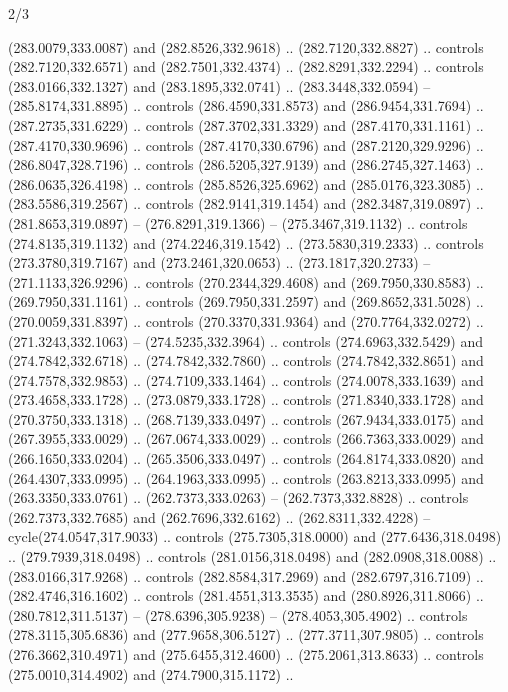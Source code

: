 \begin{flagdescription}{2/3}
\begin{scope}[xshift=0.5\flaglength,yshift=0.5\flagwidth,scale=\flagwidth/311.22]
\begin{scope}[y=0.8pt, x=0.8pt, yscale=-1,shift={(-291.77,-194.51)}]
  (283.0079,333.0087) and (282.8526,332.9618) .. (282.7120,332.8827) .. controls
  (282.7120,332.6571) and (282.7501,332.4374) .. (282.8291,332.2294) .. controls
  (283.0166,332.1327) and (283.1895,332.0741) .. (283.3448,332.0594) --
  (285.8174,331.8895) .. controls (286.4590,331.8573) and (286.9454,331.7694) ..
  (287.2735,331.6229) .. controls (287.3702,331.3329) and (287.4170,331.1161) ..
  (287.4170,330.9696) .. controls (287.4170,330.6796) and (287.2120,329.9296) ..
  (286.8047,328.7196) .. controls (286.5205,327.9139) and (286.2745,327.1463) ..
  (286.0635,326.4198) .. controls (285.8526,325.6962) and (285.0176,323.3085) ..
  (283.5586,319.2567) .. controls (282.9141,319.1454) and (282.3487,319.0897) ..
  (281.8653,319.0897) -- (276.8291,319.1366) -- (275.3467,319.1132) .. controls
  (274.8135,319.1132) and (274.2246,319.1542) .. (273.5830,319.2333) .. controls
  (273.3780,319.7167) and (273.2461,320.0653) .. (273.1817,320.2733) --
  (271.1133,326.9296) .. controls (270.2344,329.4608) and (269.7950,330.8583) ..
  (269.7950,331.1161) .. controls (269.7950,331.2597) and (269.8652,331.5028) ..
  (270.0059,331.8397) .. controls (270.3370,331.9364) and (270.7764,332.0272) ..
  (271.3243,332.1063) -- (274.5235,332.3964) .. controls (274.6963,332.5429) and
  (274.7842,332.6718) .. (274.7842,332.7860) .. controls (274.7842,332.8651) and
  (274.7578,332.9853) .. (274.7109,333.1464) .. controls (274.0078,333.1639) and
  (273.4658,333.1728) .. (273.0879,333.1728) .. controls (271.8340,333.1728) and
  (270.3750,333.1318) .. (268.7139,333.0497) .. controls (267.9434,333.0175) and
  (267.3955,333.0029) .. (267.0674,333.0029) .. controls (266.7363,333.0029) and
  (266.1650,333.0204) .. (265.3506,333.0497) .. controls (264.8174,333.0820) and
  (264.4307,333.0995) .. (264.1963,333.0995) .. controls (263.8213,333.0995) and
  (263.3350,333.0761) .. (262.7373,333.0263) -- (262.7373,332.8828) .. controls
  (262.7373,332.7685) and (262.7696,332.6162) .. (262.8311,332.4228) --
  cycle(274.0547,317.9033) .. controls (275.7305,318.0000) and
  (277.6436,318.0498) .. (279.7939,318.0498) .. controls (281.0156,318.0498) and
  (282.0908,318.0088) .. (283.0166,317.9268) .. controls (282.8584,317.2969) and
  (282.6797,316.7109) .. (282.4746,316.1602) .. controls (281.4551,313.3535) and
  (280.8926,311.8066) .. (280.7812,311.5137) -- (278.6396,305.9238) --
  (278.4053,305.4902) .. controls (278.3115,305.6836) and (277.9658,306.5127) ..
  (277.3711,307.9805) .. controls (276.3662,310.4971) and (275.6455,312.4600) ..
  (275.2061,313.8633) .. controls (275.0010,314.4902) and (274.7900,315.1172) ..

\end{scope}
\end{scope}
\end{flagdescription}
